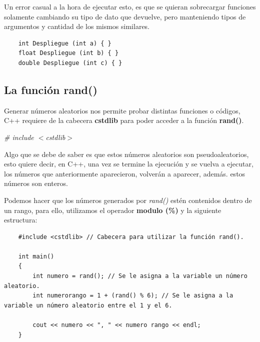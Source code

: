 Un error casual a la hora de ejecutar esto, es que se quieran sobrecargar funciones solamente cambiando su tipo de dato que devuelve, pero manteniendo tipos de argumentos y cantidad de los mismos similares.
\begin{lstlisting}
    int Despliegue (int a) { }
    float Despliegue (int b) { }
    double Despliegue (int c) { }
\end{lstlisting}


\subsection{La función rand()}
\hspace{0.55cm}Generar números aleatorios nos permite probar distintas funciones o códigos, C++ requiere de la cabecera \textbf{cstdlib} para poder acceder a la función \textbf{rand()}.
\begin{center}
	\textit{\# include $<$cstdlib$>$}
\end{center}

Algo que se debe de saber es que estos números aleatorios son pseudoaleatorios, esto quiere decir, en C++, una vez se termine la ejecución y se vuelva a ejecutar, los números que anteriormente aparecieron, volverán a aparecer, además. estos números son enteros.

Podemos hacer que los números generados por \textit{rand()} estén contenidos dentro de un rango, para ello, utilizamos el operador \textbf{modulo (\%)} y la siguiente estructura:
\begin{lstlisting}
    #include <cstdlib> // Cabecera para utilizar la función rand().
    
    int main()
    {
        int numero = rand(); // Se le asigna a la variable un número aleatorio.
        int numerorango = 1 + (rand() % 6); // Se le asigna a la variable un número aleatorio entre el 1 y el 6.
        
        cout << numero << ", " << numero rango << endl;
    }
\end{lstlisting}


